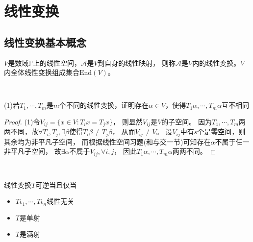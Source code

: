 \section{线性变换}

\subsection{线性变换基本概念}

\begin{definition}[线性变换]
  $V$是数域$\mathbb{P}$上的线性空间，$\mathcal{A}$是$V$到自身的线性映射，
  则称$\mathcal A$是$V$内的线性变换。$V$内全体线性变换组成集合$\mathrm{End}(V)$。
\end{definition}


~

\begin{exercise}[线性变换基本练习]
  (1)若$T_1,\cdots,T_m$是$m$个不同的线性变换，证明存在$\alpha \in V$，使得$T_1\alpha, \cdots,T_m\alpha$互不相同
\end{exercise}

\begin{proof}
  (1)令$V_{ij} = \{x \in V: T_ix = T_jx\}$，
  则显然$V_{ij}$是$V$的子空间。
  因为$T_1,\cdots,T_m$两两不同，故$\forall T_i,T_j, \exists \beta$使得$T_i\beta \neq T_j\beta$，
  从而$V_{ij} \neq V$。
  设$V_{ij}$中有$s$个是零空间，则其余均为非平凡子空间，
  而根据线性空间习题(和与交一节)可知存在$\alpha$不属于任一非平凡子空间，
  故$\exists \alpha$不属于$V_{ij}, \forall i,j$，
  因此$T_1\alpha,\cdots,T_m\alpha$两两不同。
\end{proof}

~

\begin{theorem}[线性变换的可逆性]
  线性变换$T$可逆当且仅当
  \begin{itemize}
  \item $T\epsilon_1,\cdots, T\epsilon_n$线性无关
  \item $T$是单射
  \item $T$是满射
  \end{itemize}
\end{theorem}

